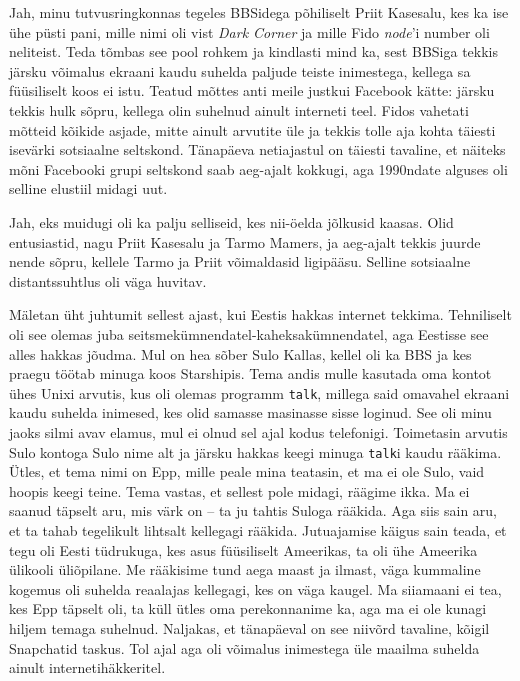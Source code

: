Jah, minu tutvusringkonnas tegeles BBSidega põhiliselt Priit 
Kasesalu, kes 
ka ise ühe püsti pani, mille nimi oli vist \emph{Dark Corner} ja mille Fido \emph{node}'i number oli neliteist. 
Teda tõmbas see pool rohkem ja 
kindlasti mind ka, sest BBSiga tekkis järsku võimalus ekraani kaudu suhelda 
paljude teiste inimestega, kellega sa füüsiliselt koos ei istu. 
Teatud mõttes anti meile justkui 
Facebook kätte: 
järsku tekkis hulk sõpru, kellega olin suhelnud ainult interneti teel. Fidos 
vahetati mõtteid kõikide asjade, mitte ainult arvutite üle ja tekkis 
tolle aja kohta täiesti isevärki sotsiaalne seltskond. Tänapäeva netiajastul on 
täiesti tavaline, et näiteks mõni Facebooki grupi seltskond saab aeg-ajalt 
kokkugi, aga 1990ndate alguses oli selline elustiil midagi uut.


Jah, eks muidugi oli ka palju selliseid, kes nii-öelda jõlkusid kaasas. Olid 
entusiastid, nagu Priit Kasesalu 
ja Tarmo Mamers, ja aeg-ajalt tekkis juurde nende 
sõpru, kellele Tarmo ja Priit võimaldasid 
ligipääsu. Selline sotsiaalne 
distantssuhtlus oli väga huvitav. 

Mäletan üht juhtumit sellest ajast, kui Eestis hakkas internet tekkima. 
Tehniliselt oli see olemas juba 
seitsmekümnendatel-kaheksakümnendatel, aga Eestisse see alles hakkas jõudma. 
Mul on hea sõber 
Sulo Kallas, kellel oli ka BBS ja kes praegu 
töötab minuga koos Starshipis. Tema andis 
mulle kasutada oma kontot ühes Unixi arvutis, kus oli olemas 
programm \verb|talk|, millega said omavahel ekraani kaudu suhelda 
inimesed, kes olid samasse masinasse sisse loginud. See oli minu 
jaoks silmi avav elamus, mul ei olnud sel ajal 
kodus telefonigi. Toimetasin arvutis Sulo kontoga Sulo nime alt 
ja järsku hakkas keegi minuga \verb|talk|i kaudu 
rääkima. Ütles, et tema nimi on Epp, mille peale mina teatasin, et ma ei ole 
Sulo, vaid hoopis keegi
teine. Tema vastas, et sellest pole midagi, räägime ikka. Ma ei 
saanud täpselt aru, mis värk on -- ta ju tahtis Suloga rääkida. Aga siis sain 
aru, et ta tahab tegelikult lihtsalt kellegagi 
rääkida.  
Jutuajamise käigus sain teada, et  
tegu oli Eesti tüdrukuga, kes asus füüsiliselt 
Ameerikas, ta oli ühe Ameerika ülikooli üliõpilane. 
Me rääkisime tund aega maast ja ilmast, väga kummaline kogemus oli suhelda 
reaalajas kellegagi, kes on väga kaugel. Ma siiamaani ei tea, 
kes Epp täpselt oli, ta küll ütles oma perekonnanime ka, aga ma ei ole kunagi 
hiljem temaga suhelnud. Naljakas, et 
tänapäeval on see niivõrd tavaline, kõigil Snapchatid taskus. Tol ajal aga oli 
võimalus 
inimestega üle maailma suhelda ainult internetihäkkeritel.

